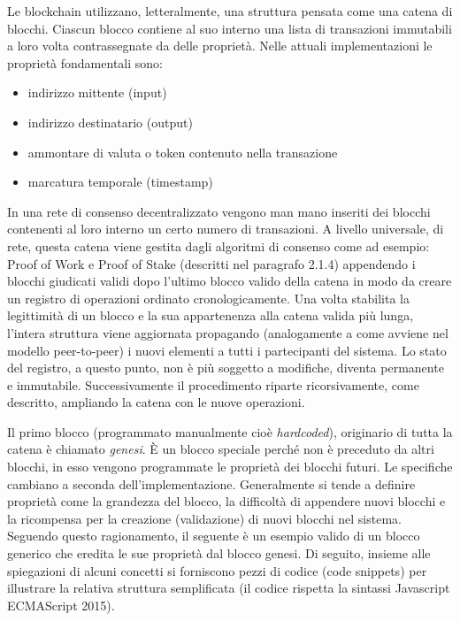 Le blockchain utilizzano, letteralmente, una struttura pensata come una catena di blocchi. Ciascun blocco contiene al suo interno una lista di transazioni immutabili a loro volta contrassegnate da delle proprietà. Nelle attuali implementazioni le proprietà fondamentali sono:

\begin{itemize}
\item indirizzo mittente (input) 
\item indirizzo destinatario (output)
\item ammontare di valuta o token contenuto nella transazione
\item marcatura temporale (timestamp)
\end{itemize}

In una rete di consenso decentralizzato vengono man mano inseriti dei blocchi contenenti al loro interno un certo numero di transazioni. A livello universale, di rete, questa catena viene gestita dagli algoritmi di consenso come ad esempio: Proof of Work e Proof of Stake (descritti nel paragrafo 2.1.4) appendendo i blocchi giudicati validi dopo l'ultimo blocco valido della catena in modo da creare un registro di operazioni ordinato cronologicamente. Una volta stabilita la legittimità di un blocco e la sua appartenenza alla catena valida più lunga, l’intera struttura viene aggiornata propagando (analogamente a come avviene nel modello peer-to-peer) i nuovi elementi a tutti i partecipanti del sistema. Lo stato del registro, a questo punto, non è più soggetto a modifiche, diventa permanente e immutabile. Successivamente il procedimento riparte ricorsivamente, come descritto, ampliando la catena con le nuove operazioni.

Il primo blocco \smallskip {} (programmato manualmente cioè \emph{hardcoded}), originario di tutta la catena è chiamato \emph{genesi}. È un blocco speciale perché non è preceduto da altri blocchi, in esso vengono programmate le proprietà dei blocchi futuri. Le specifiche cambiano a seconda dell’implementazione. Generalmente si tende a definire proprietà come la grandezza del blocco, la difficoltà di appendere nuovi blocchi e la ricompensa per la creazione (validazione) di nuovi blocchi nel sistema. 
Seguendo questo ragionamento, il seguente è un esempio valido di un blocco generico che eredita le sue proprietà dal blocco genesi.
Di seguito, insieme alle spiegazioni di alcuni concetti si forniscono pezzi di codice (code snippets) per illustrare la relativa struttura semplificata (il codice rispetta la sintassi Javascript ECMAScript 2015). 

